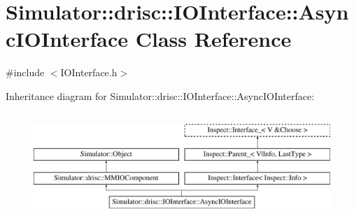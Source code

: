 \hypertarget{class_simulator_1_1drisc_1_1_i_o_interface_1_1_async_i_o_interface}{\section{Simulator\+:\+:drisc\+:\+:I\+O\+Interface\+:\+:Async\+I\+O\+Interface Class Reference}
\label{class_simulator_1_1drisc_1_1_i_o_interface_1_1_async_i_o_interface}
}


{\ttfamily \#include $<$I\+O\+Interface.\+h$>$}

Inheritance diagram for Simulator\+:\+:drisc\+:\+:I\+O\+Interface\+:\+:Async\+I\+O\+Interface\+:\begin{figure}[H]
\begin{center}
\leavevmode
\includegraphics[height=4.000000cm]{class_simulator_1_1drisc_1_1_i_o_interface_1_1_async_i_o_interface}
\end{center}
\end{figure}
